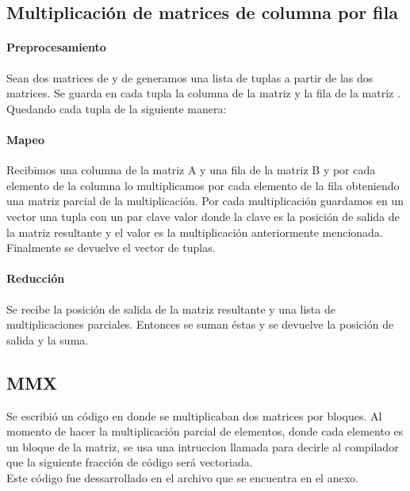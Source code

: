 \subsection{Multiplicación de matrices de columna por fila}

    \paragraph{Preprocesamiento}

        Sean dos matrices  de  y  de 
        generamos una lista de tuplas a partir de las dos matrices.
        Se guarda en cada tupla la columna  de la matriz  y
        la fila  de la matriz . Quedando cada tupla de la
        siguiente manera:\\

    \paragraph{Mapeo}
        Recibimos una columna de la matriz A y una fila de la matriz B y por cada
        elemento de la columna  lo multiplicamos por cada elemento
        de la fila  obteniendo una matriz parcial de la
        multiplicación. Por cada multiplicación guardamos en un vector una tupla
        con un par clave valor donde la clave es la posición de salida de la matriz
        resultante y el valor es la multiplicación anteriormente mencionada.
        Finalmente se devuelve el vector de tuplas.

    \paragraph{Reducción}

        Se recibe la posición de salida de la matriz resultante y una lista de
        multiplicaciones parciales. Entonces se suman éstas y se devuelve la
        posición de salida y la suma.

\subsection{MMX}
    Se escribió un código en  donde se multiplicaban dos matrices
    por bloques. Al momento de hacer la multiplicación parcial de elementos, donde
    cada elemento es un bloque de la matriz, se usa una intruccion llamada
     para decirle al  compilador que la siguiente
    fracción de código será vectoriada.\\
    Este código fue dessarrollado en el archivo  que
    se encuentra en el anexo.

